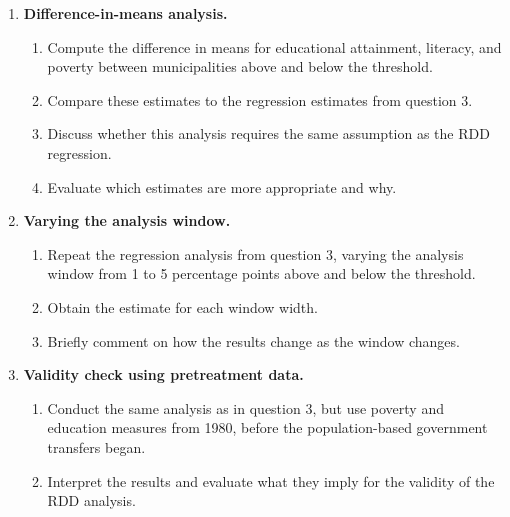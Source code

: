 \documentclass[12pt]{article}
\begin{document}
\begin{enumerate}
    \item \textbf{Difference-in-means analysis.}
    \begin{enumerate}[label=(\alph*)]
        \item Compute the difference in means for educational attainment, literacy, and poverty between municipalities above and below the threshold.
        \item Compare these estimates to the regression estimates from question 3.
        \item Discuss whether this analysis requires the same assumption as the RDD regression.
        \item Evaluate which estimates are more appropriate and why.
    \end{enumerate}

    \item \textbf{Varying the analysis window.}
    \begin{enumerate}[label=(\alph*)]
        \item Repeat the regression analysis from question 3, varying the analysis window from 1 to 5 percentage points above and below the threshold.
        \item Obtain the estimate for each window width.
        \item Briefly comment on how the results change as the window changes.
    \end{enumerate}

    \item \textbf{Validity check using pretreatment data.}
    \begin{enumerate}[label=(\alph*)]
        \item Conduct the same analysis as in question 3, but use poverty and education measures from 1980, before the population-based government transfers began.
        \item Interpret the results and evaluate what they imply for the validity of the RDD analysis.
    \end{enumerate}
\end{enumerate}
\end{document}
